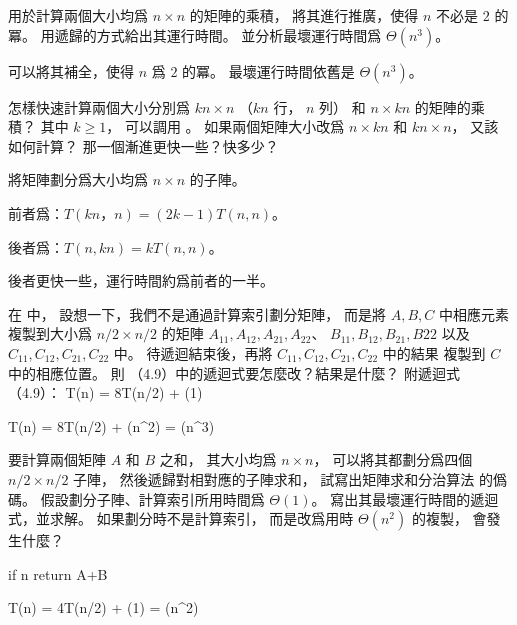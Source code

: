 \startsection[
  title={Multiplying square matrices},
]

\startEXERCISE
{} 用於計算兩個大小均爲 $n\times n$ 的矩陣的乘積，
將其進行推廣，使得 $n$ 不必是 $2$ 的冪。
用遞歸的方式給出其運行時間。
並分析最壞運行時間爲 $\Theta(n^3)$。
\stopEXERCISE

\startANSWER
可以將其補全，使得 $n$ 爲 $2$ 的冪。
最壞運行時間依舊是 $\Theta(n^3)$。
\stopANSWER

\startEXERCISE
怎樣快速計算兩個大小分別爲 $k n\times n$ （$kn$ 行， $n$ 列）
和 $n\times kn$ 的矩陣的乘積？
其中 $k\ge 1$，
可以調用 。
如果兩個矩陣大小改爲 $n\times kn$ 和 $kn\times n$，
又該如何計算？
那一個漸進更快一些？快多少？
\stopEXERCISE

\startANSWER
將矩陣劃分爲大小均爲 $n\times n$ 的子陣。

前者爲：$T(kn，n) = (2k-1)T(n,n)$。

後者爲：$T(n,kn) = k T(n,n)$。

後者更快一些，運行時間約爲前者的一半。
\stopANSWER

\startEXERCISE
在  中，
設想一下，我們不是通過計算索引劃分矩陣，
而是將 $A,B,C$ 中相應元素複製到大小爲 $n/2\times n/2$ 的矩陣
$A_{11},A_{12},A_{21},A_{22}$、 $B_{11},B_{12},B_{21},B{22}$
以及 $C_{11},C_{12},C_{21},C_{22}$ 中。
待遞迴結束後，再將 $C_{11},C_{12},C_{21},C_{22}$ 中的結果
複製到 $C$ 中的相應位置。
則 （4.9）中的遞迴式要怎麼改？結果是什麼？
附遞迴式（4.9）：
\startformula
T(n) = 8T(n/2) + \Theta(1)
\stopformula
\stopEXERCISE

\startANSWER
\startformula\startmathalignment
\NC T(n) \NC = 8T(n/2) + \Theta(n^2) \NR
\NC \NC = \Theta(n^3) \NR
\stopmathalignment\stopformula
\stopANSWER

\startEXERCISE
要計算兩個矩陣 $A$ 和 $B$ 之和，
其大小均爲 $n\times n$，
可以將其都劃分爲四個 $n/2\times n/2$ 子陣，
然後遞歸對相對應的子陣求和，
試寫出矩陣求和分治算法  的僞碼。
假設劃分子陣、計算索引所用時間爲 $\Theta(1)$。
寫出其最壞運行時間的遞迴式，並求解。
如果劃分時不是計算索引，
而是改爲用時 $\Theta(n^2)$ 的複製，
會發生什麼？
\stopEXERCISE

\startANSWER
{}
\startCLRSCODE
if n 
	return A+B
\stopCLRSCODE

\startformula\startmathalignment
\NC T(n) \NC = 4T(n/2) + \Theta(1) \NR
\NC \NC = \Theta(n^2) \NR
\stopmathalignment\stopformula
\stopANSWER

\stopsection
